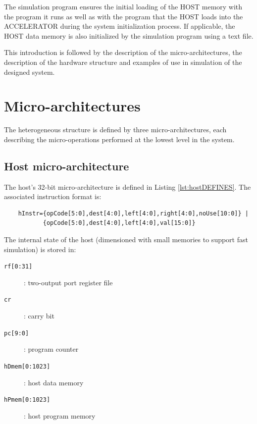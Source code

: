 
The simulation program ensures the initial loading of the HOST memory with the program it runs as well as with the program that the HOST loads into the ACCELERATOR during the system initialization process. If applicable, the HOST data memory is also initialized by the simulation program using a text file.



This introduction is followed by the description of the micro-architectures, the description of the hardware structure and examples of use in simulation of the designed system.

\section{Micro-architectures}

The heterogeneous structure is defined by three micro-architectures, each describing the micro-operations performed at the lowest level in the system.

\subsection{Host micro-architecture}

The host's 32-bit micro-architecture is defined in Listing \ref{lst:hostDEFINES}. The associated instruction format is: 
\begin{verbatim}
    hInstr={opCode[5:0],dest[4:0],left[4:0],right[4:0],noUse[10:0]} | 
           {opCode[5:0],dest[4:0],left[4:0],val[15:0]}
\end{verbatim}
The internal state of the host (dimensioned with small memories to support fast simulation) is stored in:
\begin{description}
    \item[{\tt rf[0:31]}]: two-output port register file
    \item[{\tt cr}]: carry bit
    \item[{\tt pc[9:0]}]: program counter
    \item[{\tt hDmem[0:1023]}]: host data memory
    \item[{\tt hPmem[0:1023]}]: host program memory
\end{description}


